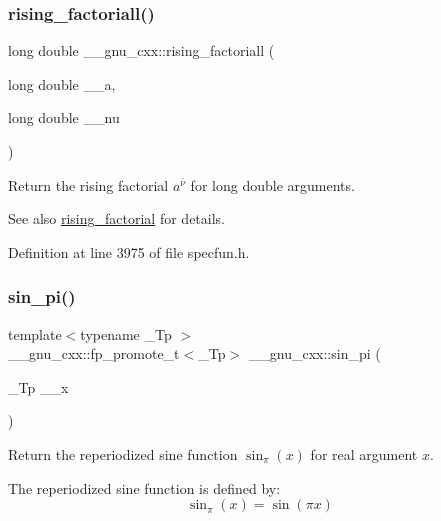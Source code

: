 \subsubsection{\texorpdfstring{rising\+\_\+factoriall()}{rising\_factoriall()}}
{\footnotesize\ttfamily long double \+\_\+\+\_\+gnu\+\_\+cxx\+::rising\+\_\+factoriall (\begin{DoxyParamCaption}\item[{long double}]{\+\_\+\+\_\+a,  }\item[{long double}]{\+\_\+\+\_\+nu }\end{DoxyParamCaption})\hspace{0.3cm}{\ttfamily [inline]}}

Return the rising factorial $ a^{\overline{\nu}} $ for {\ttfamily  long double } arguments.

\begin{DoxySeeAlso}{See also}
\hyperlink{group__gnu__math__spec__func_gae8c36a0e1f60254cf212a3806f7c675c}{rising\+\_\+factorial} for details. 
\end{DoxySeeAlso}


Definition at line 3975 of file specfun.\+h.

\mbox{\label{group__gnu__math__spec__func_ga220f8a9a0477697cff96e84dc911d5f0}} 
\subsubsection{\texorpdfstring{sin\+\_\+pi()}{sin\_pi()}}
{\footnotesize\ttfamily template$<$typename \+\_\+\+Tp $>$ \\
\+\_\+\+\_\+gnu\+\_\+cxx\+::fp\+\_\+promote\+\_\+t$<$\+\_\+\+Tp$>$ \+\_\+\+\_\+gnu\+\_\+cxx\+::sin\+\_\+pi (\begin{DoxyParamCaption}\item[{\+\_\+\+Tp}]{\+\_\+\+\_\+x }\end{DoxyParamCaption})\hspace{0.3cm}{\ttfamily [inline]}}

Return the reperiodized sine function $ \sin_\pi(x) $ for real argument $ x $.

The reperiodized sine function is defined by\+: \[ \sin_\pi(x) = \sin(\pi x) \]


